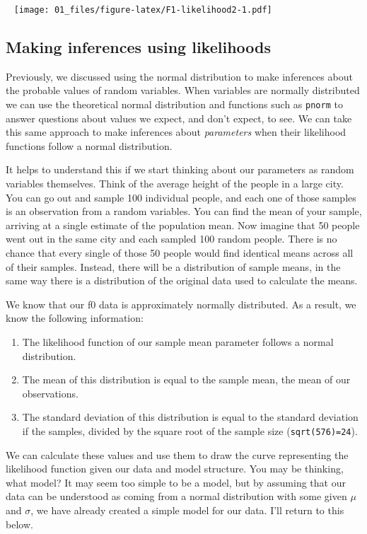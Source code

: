 \documentclass[
]{book}
\begin{document}
~
\texttt{[image: 01\_files/figure-latex/F1-likelihood2-1.pdf]}
~

\hypertarget{making-inferences-using-likelihoods}{%
\subsection{Making inferences using likelihoods}\label{making-inferences-using-likelihoods}}

Previously, we discussed using the normal distribution to make inferences about the probable values of random variables. When variables are normally distributed we can use the theoretical normal distribution and functions such as \texttt{pnorm} to answer questions about values we expect, and don't expect, to see. We can take this same approach to make inferences about \emph{parameters} when their likelihood functions follow a normal distribution.

It helps to understand this if we start thinking about our parameters as random variables themselves. Think of the average height of the people in a large city. You can go out and sample 100 individual people, and each one of those samples is an observation from a random variables. You can find the mean of your sample, arriving at a single estimate of the population mean. Now imagine that 50 people went out in the same city and each sampled 100 random people. There is no chance that every single of those 50 people would find identical means across all of their samples. Instead, there will be a distribution of sample means, in the same way there is a distribution of the original data used to calculate the means.

We know that our f0 data is approximately normally distributed. As a result, we know the following information:

\begin{enumerate}
\def\labelenumi{\arabic{enumi})}
\item
  The likelihood function of our sample mean parameter follows a normal distribution.
\item
  The mean of this distribution is equal to the sample mean, the mean of our observations.
\item
  The standard deviation of this distribution is equal to the standard deviation if the samples, divided by the square root of the sample size (\texttt{sqrt(576)=24}).
\end{enumerate}

We can calculate these values and use them to draw the curve representing the likelihood function given our data and model structure. You may be thinking, what model? It may seem too simple to be a model, but by assuming that our data can be understood as coming from a normal distribution with some given \(\mu\) and \(\sigma\), we have already created a simple model for our data. I'll return to this below.
\end{document}
